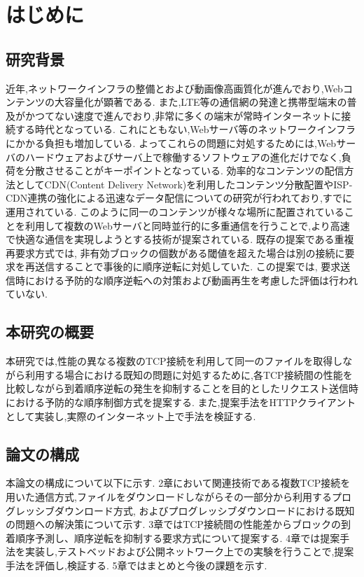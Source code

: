 \documentclass[a4j,12pt]{gradthesis_utf8}
\begin{document}
 
\maketitle %

\chapter{はじめに}\label{sec:sec1}
\section{研究背景}
近年,ネットワークインフラの整備とおよび動画像高画質化が進んでおり,Webコンテンツの大容量化が顕著である.
また,LTE等の通信網の発達と携帯型端末の普及がかつてない速度で進んでおり,非常に多くの端末が常時インターネットに接続する時代となっている.
これにともない,Webサーバ等のネットワークインフラにかかる負担も増加している.
よってこれらの問題に対処するためには,Webサーバのハードウェアおよびサーバ上で稼働するソフトウェアの進化だけでなく,負荷を分散させることがキーポイントとなっている.
効率的なコンテンツの配信方法としてCDN(Content Delivery Network)を利用したコンテンツ分散配置やISP-CDN連携の強化による迅速なデータ配信についての研究が行われており\cite{cdn},すでに運用されている.
このように同一のコンテンツが様々な場所に配置されていることを利用して複数のWebサーバと同時並行的に多重通信を行うことで,より高速で快適な通信を実現しようとする技術が提案されている.
既存の提案である重複再要求方式では, 
非有効ブロックの個数がある閾値を超えた場合は別の接続に要求を再送信することで事後的に順序逆転に対処していた.
この提案では, 要求送信時における予防的な順序逆転への対策および動画再生を考慮した評価は行われていない.

\section{本研究の概要}
本研究では,性能の異なる複数のTCP接続を利用して同一のファイルを取得しながら利用する場合における既知の問題に対処するために,各TCP接続間の性能を比較しながら到着順序逆転の発生を抑制することを目的としたリクエスト送信時における予防的な順序制御方式を提案する.
また,提案手法をHTTPクライアントとして実装し,実際のインターネット上で手法を検証する.

\section{論文の構成}
本論文の構成について以下に示す.
2章において関連技術である複数TCP接続を用いた通信方式,ファイルをダウンロードしながらその一部分から利用するプログレッシブダウンロード方式, およびプログレッシブダウンロードにおける既知の問題への解決策について示す.
3章ではTCP接続間の性能差からブロックの到着順序予測し、順序逆転を抑制する要求方式について提案する.
4章では提案手法を実装し,テストベッドおよび公開ネットワーク上での実験を行うことで,提案手法を評価し,検証する.
5章ではまとめと今後の課題を示す.
\end{document}
